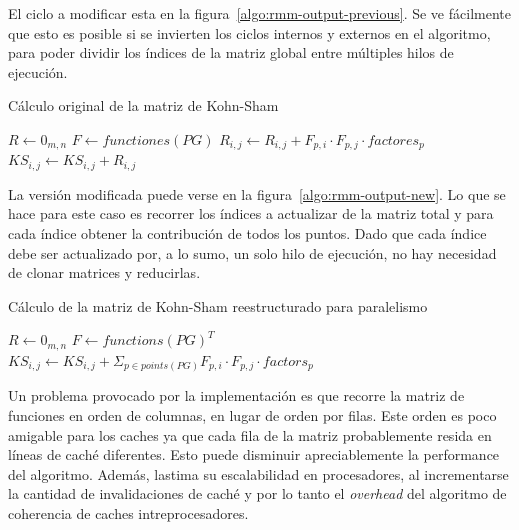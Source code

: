 El ciclo a modificar esta en la figura~\ref{algo:rmm-output-previous}.
Se ve f\'acilmente que esto es posible si se invierten los ciclos internos y externos en
el algoritmo, para poder dividir los \'indices de la matriz global entre m\'ultiples
hilos de ejecuci\'on.

\begin{algorithm}[H]
    \centering
    \caption{C\'alculo original de la matriz de Kohn-Sham}
    \label{algo:rmm-output-previous}
    \begin{algorithmic}
        \State $R \gets 0_{m,n}$
        \State $F \gets functiones(PG)$
            \State $R_{i,j} \gets R_{i,j} + F_{p,i} \cdot F_{p,j} \cdot factores_{p}$
            \EndFor
        \EndFor
            \State $KS_{i,j} \gets KS_{i,j} + R_{i,j}$
        \EndFor
    \end{algorithmic}
\end{algorithm}

La versi\'on modificada puede verse en la figura~\ref{algo:rmm-output-new}. Lo que
se hace para este caso es recorrer los \'indices a actualizar de la matriz total
y para cada \'indice obtener la contribuci\'on de todos los puntos. Dado que cada \'indice debe
ser actualizado por, a lo sumo, un solo hilo de ejecuci\'on, no hay necesidad de
clonar matrices y reducirlas.

\begin{algorithm}[H]
    \centering
    \caption{C\'alculo de la matriz de Kohn-Sham reestructurado para paralelismo}
    \label{algo:rmm-output-new}
    \begin{algorithmic}
        \State $R \gets 0_{m,n}$
        \State $F \gets functions(PG)^T$
            \State $KS_{i,j} \gets KS_{i,j} + \displaystyle \Sigma_{p \in points(PG)} F_{p,i} \cdot F_{p,j} \cdot factors_{p}$
        \EndFor
    \end{algorithmic}
\end{algorithm}

Un problema provocado por la implementaci\'on es que recorre la matriz de funciones
en orden de columnas, en lugar de orden por filas. Este orden es poco amigable
para los caches ya que cada fila de la matriz probablemente resida en l\'ineas de
cach\'e diferentes. Esto puede disminuir apreciablemente la performance del algoritmo.
Adem\'as, lastima su escalabilidad en procesadores, al incrementarse la cantidad de
invalidaciones de cach\'e y por lo tanto el \textit{overhead} del algoritmo de
coherencia de caches intreprocesadores.


